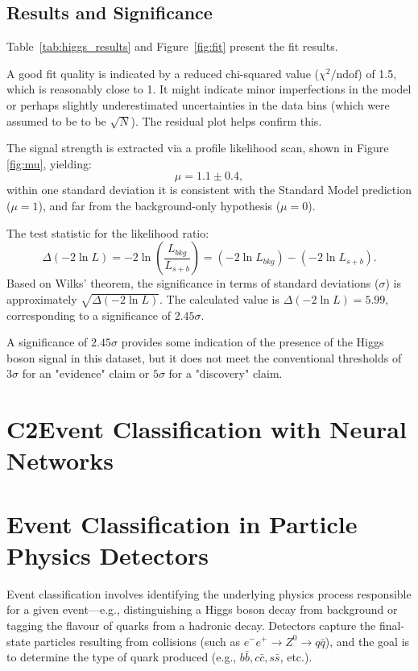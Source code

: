 \documentclass[11pt]{article}
\begin{document}
\subsection*{Results and Significance}

Table~\ref{tab:higgs_results} and Figure~\ref{fig:fit} present the fit results. 

A good fit quality is indicated by a reduced chi-squared value ($\chi^2/\text{ndof}$) of 1.5, which is reasonably close to 1. It might indicate minor imperfections in the model or perhaps slightly underestimated uncertainties in the data bins (which were assumed to be to be $\sqrt{N}$). The residual plot helps confirm this.



The signal strength is extracted via a profile likelihood scan, shown in Figure \ref{fig:mu}, yielding:
\[
\mu = 1.1 \pm 0.4,
\]
within one standard deviation it is consistent with the Standard Model prediction ($\mu=1$), and far from the background-only hypothesis ($\mu=0$).





The test statistic for the likelihood ratio:
\[
\Delta(-2 \ln L) = -2 \ln \left( \frac{L_{bkg}}{L_{s+b}} \right) = (-2 \ln L_{bkg}) - (-2 \ln L_{s+b}).
\]
Based on Wilks' theorem, the significance in terms of standard deviations ($\sigma$) is approximately $\sqrt{\Delta(-2 \ln L)}$. The calculated value is $\Delta(-2 \ln L) = 5.99$, corresponding to a significance of $2.45\sigma$.

A significance of $2.45\sigma$ provides some indication of the presence of the Higgs boson signal in this dataset, but it does not meet the conventional thresholds of $3\sigma$ for an "evidence" claim or $5\sigma$ for a "discovery" claim.



\newpage

\section*{C2\quad Event Classification with Neural Networks}


\section{Event Classification in Particle Physics Detectors}

Event classification involves identifying the underlying physics process responsible for a given event—e.g., distinguishing a Higgs boson decay from background or tagging the flavour of quarks from a hadronic decay. Detectors capture the final-state particles resulting from collisions (such as \( e^-e^+ \rightarrow Z^0 \rightarrow q\bar{q} \)), and the goal is to determine the type of quark produced (e.g., \( b\bar{b}, c\bar{c}, s\bar{s} \), etc.).
\end{document}
